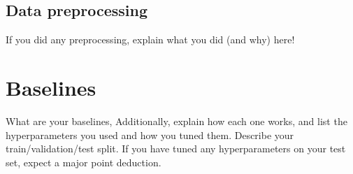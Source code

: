 \documentclass[11pt,a4paper]{article}
\begin{document}
\subsection{Data preprocessing}
If you did any preprocessing, explain what you did (and why) here! 


\section{Baselines}
What are your baselines,
Additionally, explain how each one works, and list the hyperparameters you used and how you tuned them. Describe your train/validation/test split. If you have tuned any hyperparameters on your test set, expect a major point deduction. 
\end{document}
